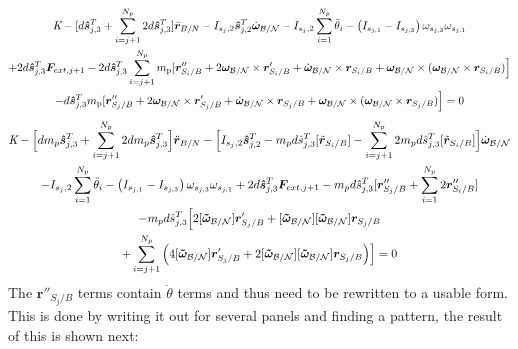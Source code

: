 \begin{multline}
	\textit{K} - [d\bm{\hat{s}}^{T}_{j,3}+\sum^{N_p}_{i=j+1}2d\bm{\hat{s}}^{T}_{j,3}]\ddot{\bm r}_{B/N} - I_{s_j,2} \bm{\hat{s}}_{j,2}^T \dot{\bm\omega}_{\cal B/N} - I_{s_j,2} \sum^{N_p}_{i=1}\ddot{\theta}_i - \left( I_{s_{j,1}} - I_{s_{j,3}}\right) \omega_{s_{j,3}} \omega_{s_{j,1}}\\
	+ 2d\bm{\hat{s}}^{T}_{j,3}\bm F_{ext,j+1} - 2d\bm{\hat{s}}^{T}_{j,3}\sum^{N_p}_{i=j+1}m_{\text{p}} [\bm r''_{S_{i}/B}+ 2 \bm\omega_{\cal B/N} \times \bm{r}'_{S_i/B} + \dot{\bm\omega}_{\cal B/N} \times \bm{r}_{S_i/B}
	+ \bm\omega_{\cal B/N} \times (\bm\omega_{\cal B/N} \times \bm{r}_{S_i/B})\Big] \\ - d\bm{\hat{s}}^{T}_{j,3} m_{\text{p}} [\bm r''_{S_{j}/B}+ 2 \bm\omega_{\cal B/N} \times \bm{r}'_{S_j/B} + \dot{\bm\omega}_{\cal B/N} \times \bm{r}_{S_j/B}
	+ \bm\omega_{\cal B/N} \times (\bm\omega_{\cal B/N} \times \bm{r}_{S_j/B})\Big] = 0 %
\end{multline}
\begin{multline}
	\textit{K} - \Big[d m_p\bm{\hat{s}}^{T}_{j,3}+\sum^{N_p}_{i=j+1}2 d m_p\bm{\hat{s}}^{T}_{j,3}\Big]\ddot{\bm r}_{B/N} - \Big[I_{s_j,2} \bm{\hat{s}}_{j,2}^T -m_p d \hat{s}^{T}_{j,3}[\tilde{{\bm r}}_{S_{i}/B}]-\sum^{N_p}_{i=j+1} 2 m_p d \hat{s}^{T}_{j,3}[\tilde{{\bm r}}_{S_{i}/B}]\Big]\dot{\bm\omega}_{\cal B/N} \\
	-I_{s_j,2} \sum^{N_p}_{i=1}\ddot{\theta}_i - \left( I_{s_{j,1}} - I_{s_{j,3}}\right) \omega_{s_{j,3}} \omega_{s_{j,1}}+ 2d\bm{\hat{s}}^{T}_{j,3}\bm F_{ext,j+1}
	-m_p d \hat{s}^{T}_{j,3}[\bm r''_{S_{j}/B} + \sum^{N_p}_{i=1} 2 \bm r''_{S_{i}/B}]\\
	-m_p d \hat{s}^{T}_{j,3}\Big[2[\bm{\tilde{\omega}}_{\cal B/N}]\bm r'_{S_{j}/B} + [\bm{\tilde{\omega}}_{\cal B/N}][\bm{\tilde{\omega}}_{\cal B/N}]\bm r_{S_{j}/B}\\
	+\sum^{N_p}_{i=j+1}\Big(4[\bm{\tilde{\omega}}_{\cal B/N}]\bm r'_{S_{j}/B} 
	+ 2[\bm{\tilde{\omega}}_{\cal B/N}][\bm{\tilde{\omega}}_{\cal B/N}]\bm r_{S_{j}/B} \Big)\Big] = 0 
\end{multline}
The $\bm r''_{S_{j}/B}$ terms contain $\ddot{\theta}$ terms and thus need to be rewritten to a usable form. This is done by writing it out for several panels and finding a pattern, the result of this is shown next:
